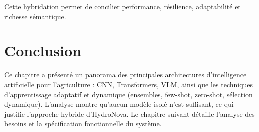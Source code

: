Cette hybridation permet de concilier performance, résilience, adaptabilité et richesse sémantique.

\section*{Conclusion}

Ce chapitre a présenté un panorama des principales architectures d'intelligence artificielle pour l'agriculture : CNN, Transformers, VLM, ainsi que les techniques d'apprentissage adaptatif et dynamique (ensembles, few-shot, zero-shot, sélection dynamique). L'analyse montre qu'aucun modèle isolé n'est suffisant, ce qui justifie l'approche hybride d'HydroNova. Le chapitre suivant détaille l'analyse des besoins et la spécification fonctionnelle du système.
